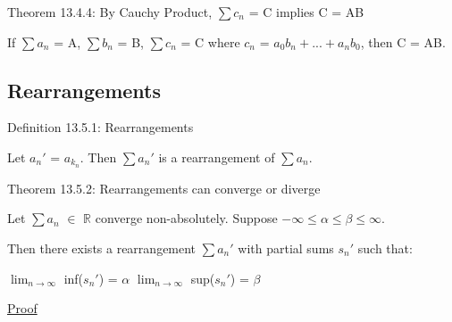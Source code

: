     \vspace{0.5cm}

{ \color{red} Theorem 13.4.4: By Cauchy Product, $\sum c_n$ = C implies C = AB }

    \begin{adjustbox}{minipage=14cm, right, vspace=0.1cm 0cm}
        If $\sum a_n$ = A, $\sum b_n$ = B, $\sum c_n$ = C
        where $c_n$ = $a_0b_n + ... + a_nb_0$, then C = AB.
    \end{adjustbox}





\subsection{ Rearrangements }

{ \color{blue} Definition 13.5.1:  Rearrangements }

    \begin{adjustbox}{minipage=14cm, right, vspace=0.1cm 0cm}
        Let $a_n'$ = $a_{k_n}$.
        Then $\sum a_n'$ is a rearrangement of $\sum a_n$.
    \end{adjustbox}

    \vspace{0.5cm}

{ \color{red} Theorem 13.5.2: Rearrangements can converge or diverge }

    \begin{adjustbox}{minipage=14cm, right, vspace=0.1cm 0cm}
        Let $\sum a_n$ $\in$ $\mathbb{R}$ converge non-absolutely.
        Suppose $-\infty \leq \alpha \leq \beta \leq \infty$.

        Then there exists a rearrangement $\sum a_n'$ with partial
        sums $s_n'$ such that:

        \hspace{1cm}
        $\lim_{n \rightarrow \infty}$ inf($s_n'$) = $\alpha$
        \hspace{1cm}
        $\lim_{n \rightarrow \infty}$ sup($s_n'$) = $\beta$
    \end{adjustbox}

{ \color{magenta} \underline{Proof} }


